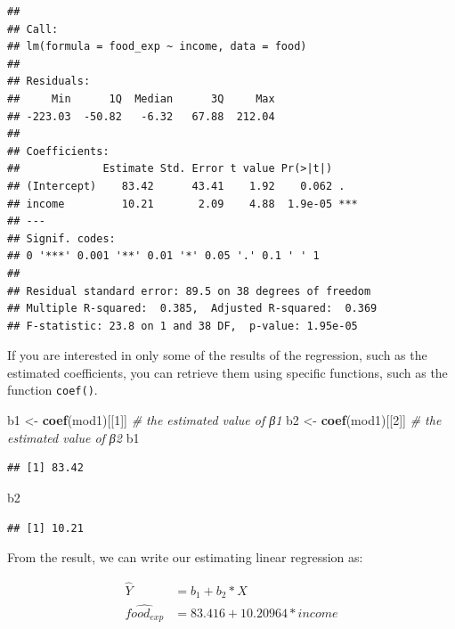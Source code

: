 \documentclass[
]{book}
\newenvironment{Shaded}{\begin{snugshade}}{\end{snugshade}}
\newcommand{\CommentTok}[1]{\textcolor[rgb]{0.56,0.35,0.01}{\textit{#1}}}
\newcommand{\DecValTok}[1]{\textcolor[rgb]{0.00,0.00,0.81}{#1}}
\newcommand{\FunctionTok}[1]{\textcolor[rgb]{0.13,0.29,0.53}{\textbf{#1}}}
\newcommand{\NormalTok}[1]{#1}
\newcommand{\OtherTok}[1]{\textcolor[rgb]{0.56,0.35,0.01}{#1}}
\begin{document}
\begin{verbatim}
## 
## Call:
## lm(formula = food_exp ~ income, data = food)
## 
## Residuals:
##     Min      1Q  Median      3Q     Max 
## -223.03  -50.82   -6.32   67.88  212.04 
## 
## Coefficients:
##             Estimate Std. Error t value Pr(>|t|)    
## (Intercept)    83.42      43.41    1.92    0.062 .  
## income         10.21       2.09    4.88  1.9e-05 ***
## ---
## Signif. codes:  
## 0 '***' 0.001 '**' 0.01 '*' 0.05 '.' 0.1 ' ' 1
## 
## Residual standard error: 89.5 on 38 degrees of freedom
## Multiple R-squared:  0.385,  Adjusted R-squared:  0.369 
## F-statistic: 23.8 on 1 and 38 DF,  p-value: 1.95e-05
\end{verbatim}

If you are interested in only some of the results of the regression, such as the estimated coefficients, you can retrieve them using specific functions, such as the function \texttt{coef()}.

\begin{Shaded}
\begin{Highlighting}[]
\NormalTok{b1 }\OtherTok{\textless{}{-}} \FunctionTok{coef}\NormalTok{(mod1)[[}\DecValTok{1}\NormalTok{]]                                }\CommentTok{\# the estimated value of  β1}
\NormalTok{b2 }\OtherTok{\textless{}{-}} \FunctionTok{coef}\NormalTok{(mod1)[[}\DecValTok{2}\NormalTok{]]                                }\CommentTok{\# the estimated value of  β2}
\NormalTok{b1}
\end{Highlighting}
\end{Shaded}

\begin{verbatim}
## [1] 83.42
\end{verbatim}

\begin{Shaded}
\begin{Highlighting}[]
\NormalTok{b2}
\end{Highlighting}
\end{Shaded}

\begin{verbatim}
## [1] 10.21
\end{verbatim}

From the result, we can write our estimating linear regression as:

\[
\begin{aligned}
\hat{Y}&=b_1+b_2*X \\
\hat{food_{exp}}&=83.416+10.20964*income
\end{aligned}
\]
\end{document}
